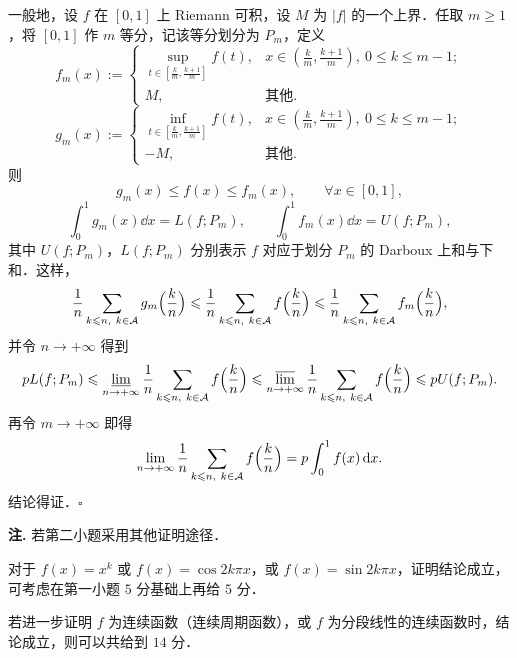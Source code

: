 \begin{solution}
一般地，设 $f$ 在 $[0,1]$ 上 Riemann 可积，设 $M$ 为 $|f|$ 的一个上界．任取 $m\geqslant 1$，将 $[0,1]$ 作 $m$ 等分，记该等分划分为 $P_m$，定义
\[
f_m(x):=\begin{cases}
\sup\limits_{t\in\left[\frac{k}{m},\frac{k+1}{m}\right]}f(t), & x\in\left(\frac{k}{m},\frac{k+1}{m}\right),\ 0\leqslant k\leqslant m-1;\\[2mm]
M, & \text{其他}.
\end{cases}
\]
\[
g_m(x):=\begin{cases}
\inf\limits_{t\in\left[\frac{k}{m},\frac{k+1}{m}\right]}f(t), & x\in\left(\frac{k}{m},\frac{k+1}{m}\right),\ 0\leqslant k\leqslant m-1;\\[2mm]
-M, & \text{其他}.
\end{cases}
\]
则
\[
g_m(x)\leqslant f(x)\leqslant f_m(x),\qquad \forall x\in[0,1],
\]
\[
\int_0^1 g_m(x)\dd x=L(f;P_m),\qquad \int_0^1 f_m(x)\dd x=U(f;P_m),
\]
其中 $U(f;P_m)$，$L(f;P_m)$ 分别表示 $f$ 对应于划分 $P_m$ 的 Darboux 上和与下和．这样，
\[
\frac{1}{n}\sum_{k\leqslant n,\ k\in\mathcal{A}}g_m\Bigl(\frac{k}{n}\Bigr)
\leqslant\frac{1}{n}\sum_{k\leqslant n,\ k\in\mathcal{A}}f\Bigl(\frac{k}{n}\Bigr)
\leqslant\frac{1}{n}\sum_{k\leqslant n,\ k\in\mathcal{A}}f_m\Bigl(\frac{k}{n}\Bigr),
\]
并令 $n\to+\infty$ 得到
\[
pL(f;P_m)\leqslant\varliminf_{n\to+\infty}\frac{1}{n}\sum_{k\leqslant n,\ k\in\mathcal{A}}f\Bigl(\frac{k}{n}\Bigr)
\leqslant\varlimsup_{n\to+\infty}\frac{1}{n}\sum_{k\leqslant n,\ k\in\mathcal{A}}f\Bigl(\frac{k}{n}\Bigr)
\leqslant pU(f;P_m).
\]
再令 $m\to+\infty$ 即得
\[
\lim_{n\to+\infty}\frac{1}{n}\sum_{k\leqslant n,\ k\in\mathcal{A}}f\Bigl(\frac{k}{n}\Bigr)=p\int_0^1 f(x)\dd x.
\]
结论得证．$\square$

\textbf{注.} 若第二小题采用其他证明途径．

对于 $f(x)=x^k$ 或 $f(x)=\cos 2k\pi x$，或 $f(x)=\sin 2k\pi x$，证明结论成立，可考虑在第一小题 $5$ 分基础上再给 $5$ 分．

若进一步证明 $f$ 为连续函数（连续周期函数），或 $f$ 为分段线性的连续函数时，结论成立，则可以共给到 $14$ 分．
\end{solution}
